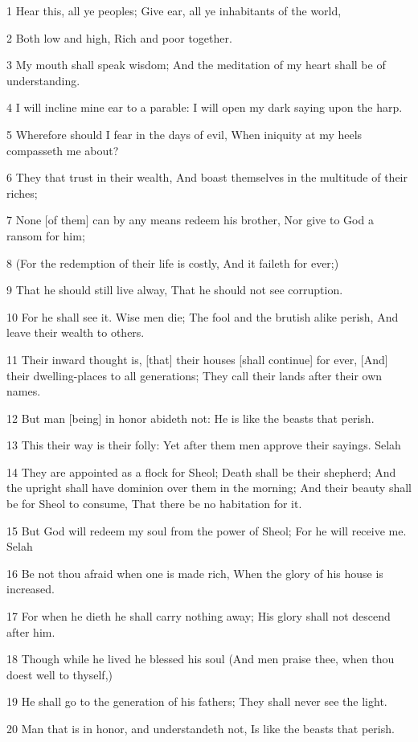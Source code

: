 \par 1 Hear this, all ye peoples; Give ear, all ye inhabitants of the world,
\par 2 Both low and high, Rich and poor together.
\par 3 My mouth shall speak wisdom; And the meditation of my heart shall be of understanding.
\par 4 I will incline mine ear to a parable: I will open my dark saying upon the harp.
\par 5 Wherefore should I fear in the days of evil, When iniquity at my heels compasseth me about?
\par 6 They that trust in their wealth, And boast themselves in the multitude of their riches;
\par 7 None [of them] can by any means redeem his brother, Nor give to God a ransom for him;
\par 8 (For the redemption of their life is costly, And it faileth for ever;)
\par 9 That he should still live alway, That he should not see corruption.
\par 10 For he shall see it. Wise men die; The fool and the brutish alike perish, And leave their wealth to others.
\par 11 Their inward thought is, [that] their houses [shall continue] for ever, [And] their dwelling-places to all generations; They call their lands after their own names.
\par 12 But man [being] in honor abideth not: He is like the beasts that perish.
\par 13 This their way is their folly: Yet after them men approve their sayings. Selah
\par 14 They are appointed as a flock for Sheol; Death shall be their shepherd; And the upright shall have dominion over them in the morning; And their beauty shall be for Sheol to consume, That there be no habitation for it.
\par 15 But God will redeem my soul from the power of Sheol; For he will receive me. Selah
\par 16 Be not thou afraid when one is made rich, When the glory of his house is increased.
\par 17 For when he dieth he shall carry nothing away; His glory shall not descend after him.
\par 18 Though while he lived he blessed his soul (And men praise thee, when thou doest well to thyself,)
\par 19 He shall go to the generation of his fathers; They shall never see the light.
\par 20 Man that is in honor, and understandeth not, Is like the beasts that perish.

